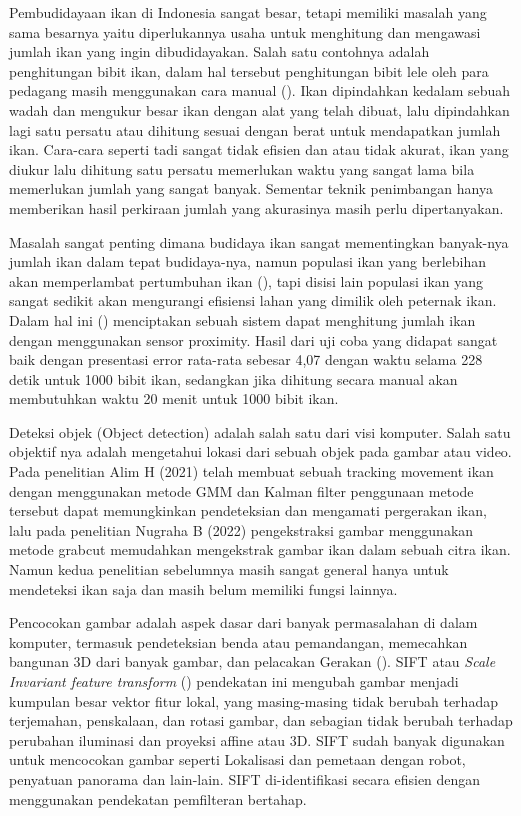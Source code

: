 Pembudidayaan ikan di Indonesia sangat besar, tetapi memiliki masalah yang sama besarnya yaitu diperlukannya usaha untuk menghitung dan mengawasi jumlah ikan yang ingin dibudidayakan. 
Salah satu contohnya adalah penghitungan bibit ikan, dalam hal tersebut penghitungan bibit lele oleh para pedagang masih menggunakan cara manual (\cite{Amri2020}). 
Ikan dipindahkan kedalam sebuah wadah dan mengukur besar ikan dengan alat yang telah dibuat, lalu dipindahkan lagi satu persatu atau dihitung sesuai dengan berat untuk mendapatkan jumlah ikan. 
Cara-cara seperti tadi sangat tidak efisien dan atau tidak akurat, ikan yang diukur lalu dihitung satu persatu memerlukan waktu yang sangat lama bila memerlukan jumlah yang sangat banyak. 
Sementar teknik penimbangan hanya memberikan hasil perkiraan jumlah yang akurasinya masih perlu dipertanyakan. 

Masalah sangat penting dimana budidaya ikan sangat mementingkan banyak-nya jumlah ikan dalam tepat budidaya-nya, namun populasi ikan yang berlebihan akan memperlambat pertumbuhan ikan (\cite{Diansari2013}), 
tapi disisi lain populasi ikan yang sangat sedikit akan mengurangi efisiensi lahan yang dimilik oleh peternak ikan. 
Dalam hal ini (\cite{Amri2020}) menciptakan sebuah sistem dapat menghitung jumlah ikan dengan menggunakan sensor proximity. 
Hasil dari uji coba yang didapat sangat baik dengan presentasi error rata-rata sebesar 4,07 dengan waktu selama 228 detik untuk 1000 bibit ikan, 
sedangkan jika dihitung secara manual akan membutuhkan waktu 20 menit untuk 1000 bibit ikan. 

Deteksi objek (Object detection) adalah salah satu dari visi komputer. Salah satu objektif nya adalah mengetahui lokasi dari sebuah objek pada gambar atau video. 
Pada penelitian Alim H (2021) telah membuat sebuah tracking movement ikan dengan menggunakan metode GMM dan Kalman filter penggunaan metode tersebut dapat memungkinkan 
pendeteksian dan mengamati pergerakan ikan, lalu pada penelitian Nugraha B (2022) pengekstraksi gambar menggunakan metode grabcut memudahkan mengekstrak gambar ikan dalam sebuah citra ikan. 
Namun kedua penelitian sebelumnya masih sangat general hanya untuk mendeteksi ikan saja dan masih belum memiliki fungsi lainnya. 

Pencocokan gambar adalah aspek dasar dari banyak permasalahan di dalam komputer, termasuk pendeteksian benda atau pemandangan, memecahkan bangunan 3D dari banyak gambar, dan pelacakan Gerakan (\cite{Lowe2004}). 
SIFT atau \emph{Scale Invariant feature transform} (\cite{Lowe1999}) pendekatan ini mengubah gambar menjadi kumpulan besar vektor fitur lokal, yang masing-masing tidak berubah terhadap terjemahan, penskalaan, dan rotasi gambar, dan sebagian tidak berubah terhadap perubahan iluminasi dan proyeksi affine atau 3D. 
SIFT sudah banyak digunakan untuk mencocokan gambar seperti Lokalisasi dan pemetaan dengan robot, penyatuan panorama dan lain-lain. SIFT di-identifikasi secara efisien dengan menggunakan pendekatan pemfilteran bertahap. 

